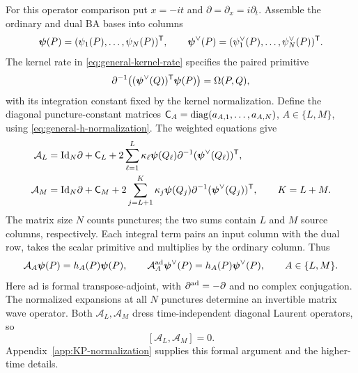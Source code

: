 For this operator comparison put $x=-it$ and
$\partial=\partial_x=i\partial_t$. Assemble the
ordinary and dual BA bases into columns
\[
 \boldsymbol\psi(P)=(\psi_1(P),\ldots,\psi_N(P))^{\mathsf T},\qquad
 \boldsymbol\psi^\vee(P)=(\psi_1^\vee(P),\ldots,\psi_N^\vee(P))^{\mathsf T}.
\]
The kernel rate in \cref{eq:general-kernel-rate} specifies the paired
primitive
\begin{equation}\label{eq:KP-paired-primitive}
 \partial^{-1}\!\left(
 (\boldsymbol\psi^\vee(Q))^{\mathsf T}\boldsymbol\psi(P)\right)
 =\Omega(P,Q),
\end{equation}
with its integration constant fixed by the kernel normalization.
Define the diagonal puncture-constant matrices
$\mathsf C_A=\operatorname{diag}(a_{A,1},\ldots,a_{A,N})$, $A\in\{L,M\}$,
using \cref{eq:general-h-normalization}. The weighted equations give
\begin{equation}\label{eq:BA-constrained-operators}
\begin{aligned}
 \mathcal A_L&=\mathrm{Id}_N\partial+\mathsf C_L+
  2\sum_{\ell=1}^{L}\kappa_\ell\boldsymbol\psi(Q_\ell)
     \partial^{-1}(\boldsymbol\psi^\vee(Q_\ell))^{\mathsf T},\\
 \mathcal A_M&=\mathrm{Id}_N\partial+\mathsf C_M+
  2\sum_{j=L+1}^{K}\kappa_j\boldsymbol\psi(Q_j)
     \partial^{-1}(\boldsymbol\psi^\vee(Q_j))^{\mathsf T},
 \qquad K=L+M.
\end{aligned}
\end{equation}
The matrix size $N$ counts punctures; the two sums contain $L$ and
$M$ source columns, respectively. Each integral term pairs an input
column with the dual row, takes the
scalar primitive and multiplies by the ordinary column. Thus
\begin{equation}\label{eq:KP-matrix-spectral}
 \mathcal A_A\boldsymbol\psi(P)=h_A(P)\boldsymbol\psi(P),\qquad
 \mathcal A_A^{\rm ad}\boldsymbol\psi^\vee(P)
        =h_A(P)\boldsymbol\psi^\vee(P),\qquad A\in\{L,M\}.
\end{equation}
Here $\mathrm{ad}$ is formal transpose-adjoint, with
$\partial^{\rm ad}=-\partial$ and no complex conjugation.
The normalized expansions at all $N$ punctures determine an
invertible matrix wave operator. Both $\mathcal A_L,\mathcal A_M$
dress time-independent diagonal Laurent operators, so
\begin{equation}\label{eq:KP-matrix-commutation}
 [\mathcal A_L,\mathcal A_M]=0.
\end{equation}
Appendix~\ref{app:KP-normalization} supplies this formal argument and
the higher-time details.


